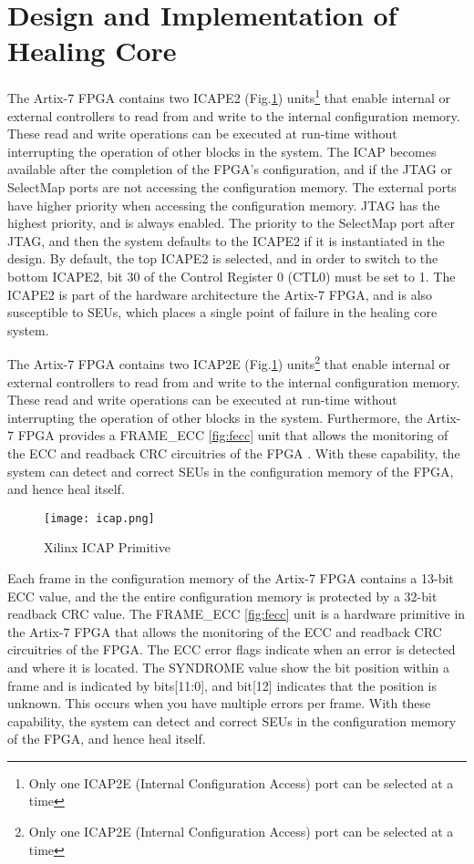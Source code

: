 \section{Design and Implementation of Healing Core}
\label{label:HC}
The Artix-7 FPGA contains two ICAPE2 (Fig.\ref{fig:icap}) units\footnote{Only one ICAP2E (Internal Configuration Access) port can be selected at a time} that enable internal or external controllers to read from and write to the internal configuration memory. These read and write operations can be executed at run-time without interrupting the operation of other blocks in the system. The ICAP becomes available after the completion of the FPGA's configuration, and if the JTAG or SelectMap ports are not accessing the configuration memory. The external ports have higher priority when accessing the configuration memory. JTAG has the highest priority, and is always enabled. The priority to the SelectMap port after JTAG, and then the system defaults to the ICAPE2 if it is instantiated in the design. By default, the top ICAPE2 is selected, and in order to switch to the bottom ICAPE2, bit 30 of the Control Register 0 (CTL0) must be set to 1. The ICAPE2 is part of the hardware architecture the Artix-7 FPGA, and is also susceptible to SEUs, which places a single point of failure in the healing core system.    

The Artix-7 FPGA contains two ICAP2E (Fig.\ref{fig:icap}) units\footnote{Only one ICAP2E (Internal Configuration Access) port can be selected at a time} that enable internal or external controllers to read from and write to the internal configuration memory. These read and write operations can be executed at run-time without interrupting the operation of other blocks in the system. Furthermore, the Artix-7 FPGA provides a FRAME\_ECC \ref{fig:fecc} unit that allows the monitoring of the ECC and readback CRC circuitries of the FPGA \cite{vhdl.xilinx}. With these capability, the system can detect and correct SEUs in the configuration memory of the FPGA, and hence heal itself. 

\begin{figure}[!ht]
    \centering
        \texttt{[image: icap.png]}
        \caption{Xilinx ICAP Primitive \cite{vhdl.xilinx}}
    \label{fig:icap}
\end{figure}

Each frame in the configuration memory of the Artix-7 FPGA contains a 13-bit ECC value, and the the entire configuration memory is protected by a 32-bit readback CRC value. The FRAME\_ECC \ref{fig:fecc} unit is a hardware primitive in the Artix-7 FPGA that allows the monitoring of the ECC and readback CRC circuitries of the FPGA. The ECC error flags indicate when an error is detected and where it is located. The SYNDROME value show the bit position within a frame and is indicated by bits[11:0], and bit[12] indicates that the position is unknown. This occurs when you have multiple errors per frame\cite{vhdl.xilinx}. With these capability, the system can detect and correct SEUs in the configuration memory of the FPGA, and hence heal itself.

